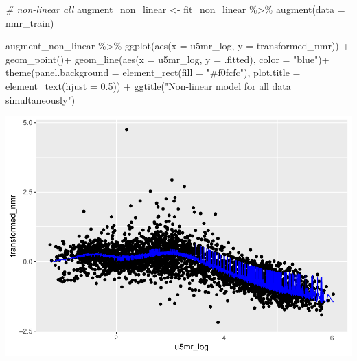 \documentclass[
]{article}
\newenvironment{Shaded}{\begin{snugshade}}{\end{snugshade}}
\newcommand{\AttributeTok}[1]{\textcolor[rgb]{0.77,0.63,0.00}{#1}}
\newcommand{\CommentTok}[1]{\textcolor[rgb]{0.56,0.35,0.01}{\textit{#1}}}
\newcommand{\FloatTok}[1]{\textcolor[rgb]{0.00,0.00,0.81}{#1}}
\newcommand{\FunctionTok}[1]{\textcolor[rgb]{0.00,0.00,0.00}{#1}}
\newcommand{\NormalTok}[1]{#1}
\newcommand{\OtherTok}[1]{\textcolor[rgb]{0.56,0.35,0.01}{#1}}
\newcommand{\SpecialCharTok}[1]{\textcolor[rgb]{0.00,0.00,0.00}{#1}}
\newcommand{\StringTok}[1]{\textcolor[rgb]{0.31,0.60,0.02}{#1}}
\begin{document}
\begin{Shaded}
\begin{Highlighting}[]
\CommentTok{\# non{-}linear all}
\NormalTok{augment\_non\_linear }\OtherTok{\textless{}{-}}\NormalTok{ fit\_non\_linear }\SpecialCharTok{\%\textgreater{}\%} 
  \FunctionTok{augment}\NormalTok{(}\AttributeTok{data =}\NormalTok{ nmr\_train) }


\NormalTok{augment\_non\_linear }\SpecialCharTok{\%\textgreater{}\%} 
  \FunctionTok{ggplot}\NormalTok{(}\FunctionTok{aes}\NormalTok{(}\AttributeTok{x =}\NormalTok{ u5mr\_log, }\AttributeTok{y =}\NormalTok{ transformed\_nmr)) }\SpecialCharTok{+}
  \FunctionTok{geom\_point}\NormalTok{()}\SpecialCharTok{+}
  \FunctionTok{geom\_line}\NormalTok{(}\FunctionTok{aes}\NormalTok{(}\AttributeTok{x =}\NormalTok{ u5mr\_log, }\AttributeTok{y =}\NormalTok{ .fitted), }\AttributeTok{color =} \StringTok{"blue"}\NormalTok{)}\SpecialCharTok{+}
  \FunctionTok{theme}\NormalTok{(}\AttributeTok{panel.background =} \FunctionTok{element\_rect}\NormalTok{(}\AttributeTok{fill =} \StringTok{"\#f0fcfc"}\NormalTok{),}
        \AttributeTok{plot.title =} \FunctionTok{element\_text}\NormalTok{(}\AttributeTok{hjust =} \FloatTok{0.5}\NormalTok{)) }\SpecialCharTok{+}
  \FunctionTok{ggtitle}\NormalTok{(}\StringTok{"Non{-}linear model for all data simultaneously"}\NormalTok{)}
\end{Highlighting}
\end{Shaded}

\includegraphics{A2_files/figure-latex/unnamed-chunk-17-1.pdf}
\end{document}
